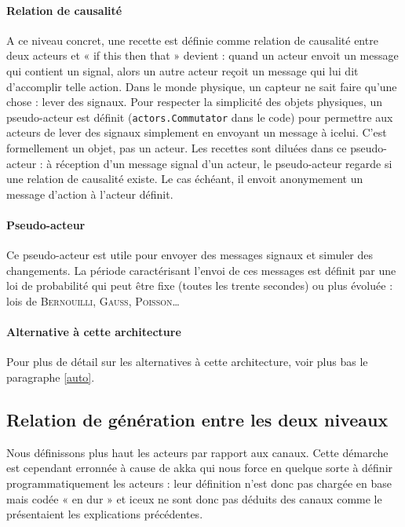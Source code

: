 \documentclass[11pt]{article}
\begin{document}
\paragraph{Relation de causalité} A ce niveau concret, une recette est définie comme relation de causalité entre deux acteurs et « if this then that » devient : quand un acteur envoit un message qui contient un signal, alors un autre acteur reçoit un message qui lui dit d'accomplir telle action. Dans le monde physique, un capteur ne sait faire qu'une chose : lever des signaux. Pour respecter la simplicité des objets physiques, un pseudo-acteur est définit (\texttt{actors.Commutator} dans le code) pour permettre aux acteurs de lever des signaux simplement en envoyant un message à icelui. C'est formellement un objet, pas un acteur. Les recettes sont \og diluées \fg{} dans ce pseudo-acteur : à réception d'un message signal d'un acteur, le pseudo-acteur regarde si une relation de causalité existe. Le cas échéant, il envoit anonymement un message d'action à l'acteur définit.

\paragraph{Pseudo-acteur} Ce pseudo-acteur est utile pour envoyer des messages signaux et simuler des changements. La période caractérisant l'envoi de ces messages est définit par une loi de probabilité qui peut être fixe (toutes les trente secondes) ou plus évoluée : lois de \textsc{Bernouilli}, \textsc{Gauss}, \textsc{Poisson}\dots

\paragraph{Alternative à cette architecture} Pour plus de détail sur les alternatives à cette architecture, voir plus bas le paragraphe \ref{auto}.

\subsection{Relation de génération entre les deux niveaux}

Nous définissons plus haut les acteurs par rapport aux canaux. Cette démarche est cependant erronnée à cause de akka qui nous force en quelque sorte à définir programmatiquement les acteurs : leur définition n'est donc pas chargée en base mais codée « en dur » et iceux ne sont donc pas déduits des canaux comme le présentaient les explications précédentes.
\end{document}
